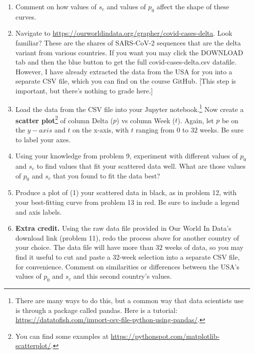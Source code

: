 \documentclass[11pt,onecolumn,superscriptaddress,notitlepage]{article}
\begin{document}
\begin{enumerate}[resume]
\begin{enumerate}
\begin{itemize}
		\end{itemize}
	\end{enumerate}
	\item Comment on how values of $s_c$ and values of $p_0$ affect the shape of these curves. 
	\item Navigate to \href{https://ourworldindata.org/grapher/covid-cases-delta?country=AUS~BRA~GBR~USA~ITA~ESP~DEU~IND}{https://ourworldindata.org/grapher/covid-cases-delta}. Look familiar? These are the shares of SARS-CoV-2 sequences that are the delta variant from various countries. If you want you may click the DOWNLOAD tab and then the blue button to get the full covid-cases-delta.csv datafile. However, I have already extracted the data from the USA for you into a separate CSV file, which you can find on the course GitHub. [This step is important, but there's nothing to grade here.]
	\item Load the data from the CSV file into your Jupyter notebook.\footnote{There are many ways to do this, but a common way that data scientists use is through a package called pandas. Here is a tutorial: \href{https://datatofish.com/import-csv-file-python-using-pandas/}{https://datatofish.com/import-csv-file-python-using-pandas/}.} Now create a {\bf scatter plot}\footnote{You can find some examples at \href{https://pythonspot.com/matplotlib-scatterplot/}{https://pythonspot.com/matplotlib-scatterplot/}.} of column Delta ($p$) vs column Week ($t$). Again, let $p$ be on the $y-axis$ and $t$ on the x-axis, with $t$ ranging from $0$ to $32$ weeks. Be sure to label your axes. 
	\item Using your knowledge from problem 9, experiment with different values of $p_0$ and $s_c$ to find values that fit your scattered data well. What are those values of $p_0$ and $s_c$ that you found to fit the data best?
	\item Produce a plot of (1) your scattered data in black, as in problem 12, with your best-fitting curve from problem 13 in red. Be sure to include a legend and axis labels.
	\item {\bf Extra credit.} Using the raw data file provided in Our World In Data's download link (problem 11), redo the process above for another country of your choice. The data file will have more than $32$ weeks of data, so you may find it useful to cut and paste a 32-week selection into a separate CSV file, for convenience. Comment on similarities or differences between the USA's values of $p_0$ and $s_c$ and this second country's values. 
\end{enumerate}

\end{document}
